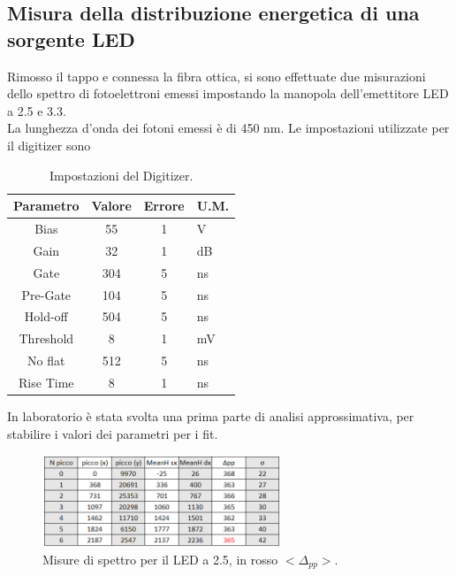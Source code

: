 \documentclass[11pt]{article} %
\begin{document}
\subsection{Misura della distribuzione energetica di una sorgente LED}
Rimosso il tappo e connessa la fibra ottica, si sono effettuate due misurazioni dello spettro di fotoelettroni emessi impostando la manopola dell'emettitore LED a 2.5 e 3.3.\\La lunghezza d'onda dei fotoni emessi è di 450 nm.
Le impostazioni utilizzate per il digitizer sono
\begin{table}[!h]
\begin{center}
\begin{tabular}{|c|c|c|l|}
\hline
\multicolumn{1}{|l|}{Parametro} & \multicolumn{1}{l|}{Valore} & \multicolumn{1}{l|}{Errore} & U.M. \\ \hline
Bias                               &55                       & 1                       & V\\ \hline
Gain                               & 32                       & 1                          & dB   \\ \hline
Gate                               & 304                       & 5                       & ns \\ \hline
Pre-Gate                               & 104                     & 5                        & ns   \\ \hline
Hold-off                               & 504                     & 5                         & ns \\ \hline
Threshold                               & 8                      & 1                          & mV   \\ \hline
No flat                               & 512                       & 5                         & ns   \\ \hline
Rise Time                               & 8                       & 1                          & ns  \\ \hline
\end{tabular}
\end{center}
\caption{Impostazioni del Digitizer.}
\end{table}
\newpage
In laboratorio è stata svolta una prima parte di analisi approssimativa, per stabilire i valori dei parametri per i fit.
\begin{figure}[h!]
\begin{center}
\includegraphics[width=270px]{img/tab25.png}
\caption{Misure di spettro per il LED a 2.5, in rosso $<\!\!\Delta_{pp}\!\!>$.}
\label{fig:Sipm25}
\end{center}
\end{figure}
\end{document}
